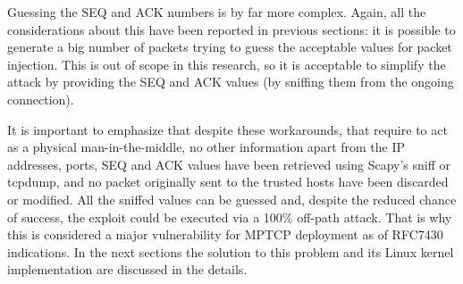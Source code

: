 Guessing the SEQ and ACK numbers is by far more complex. Again, all the considerations about this have been reported in previous sections: it is possible to generate a big number of packets trying to guess the acceptable values for packet injection. This is out of scope in this research, so it is acceptable to simplify the attack by providing the SEQ and ACK values (by sniffing them from the ongoing connection).

It is important to emphasize that despite these workarounds, that require to act as a physical man-in-the-middle,  no other information apart from the IP addresses, ports, SEQ and ACK values have been retrieved using Scapy's sniff or tcpdump, and no packet originally sent to the trusted hosts have been discarded or modified. All the sniffed values can be guessed and, despite the reduced chance of success, the exploit could be executed via a 100\% off-path attack. That is why this is considered a major vulnerability for MPTCP deployment as of RFC7430 indications. In the next sections the solution to this problem and its Linux kernel implementation are discussed in the details.